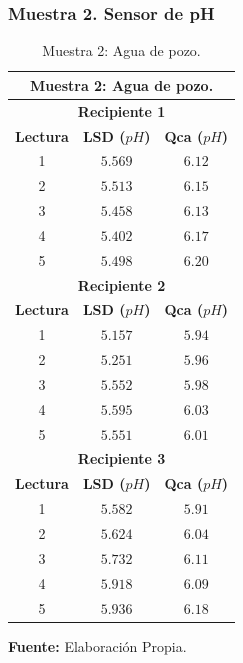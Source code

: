 \subsubsection{Muestra 2. Sensor de pH}
    \begin{table}[H]
        \protect\caption[Muestra 2: Agua de pozo ]{Muestra 2: Agua de pozo.}
        \label{tab:phMuestra2}
        \centering
        \begin{tabular}{|c|c|c|}
            \hline
            \multicolumn{3}{|c|}{\textbf{Muestra 2: Agua de pozo.}} \\
             \hline
            \multicolumn{3}{|c|}{\textbf{Recipiente 1}} \\
            \hline
            \textbf{Lectura}&\textbf{LSD ($pH$)}&\textbf{Qca ($pH$)} \\
            \hline
            {1}& $5.569$&$6.12$ \\ 
            \hline
            {2}& $5.513$&$6.15$ \\ 
            \hline
            {3}& $5.458$&$6.13$\\  
            \hline
            {4}& $5.402$&$6.17$\\ 
            \hline
            {5}& $5.498$&$6.20$ \\
            \hline
            \multicolumn{3}{|c|}{\textbf{Recipiente 2}} \\
            \hline
            \textbf{Lectura}&\textbf{LSD ($pH$)}&\textbf{Qca ($pH$)} \\
            \hline
            {1}& $5.157$&$5.94$ \\ 
            \hline
            {2}& $5.251$&$5.96$ \\ 
            \hline
            {3}& $5.552$&$5.98$\\  
            \hline
            {4}& $5.595$&$6.03$\\ 
            \hline
            {5}& $5.551$&$6.01$ \\
            \hline
            \multicolumn{3}{|c|}{\textbf{Recipiente 3}} \\
            \hline
            \textbf{Lectura}&\textbf{LSD ($pH$)}&\textbf{Qca ($pH$)} \\
            \hline
            {1}& $5.582$&$5.91$ \\ 
            \hline
            {2}& $5.624$&$6.04$ \\ 
            \hline
             {3}&$5.732$&$6.11$\\  
            \hline
            {4}& $5.918$&$6.09$\\ 
            \hline
            {5}& $5.936$&$6.18$ \\
            \hline
        \end{tabular}
        \vspace{5mm}
        \newline
        \hfill \textbf{Fuente: }Elaboración Propia.
    \end{table}

